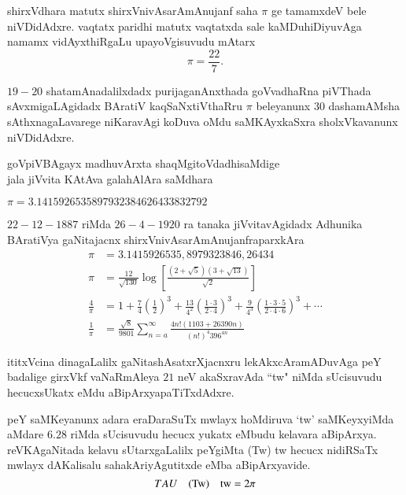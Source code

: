 shirxVdhara matutx shirxVnivAsarAmAnujanf saha $\pi$ ge tamamxdeV bele niVDidAdxre. vaqtatx paridhi matutx vaqtatxda sale kaMDuhiDiyuvAga namamx vidAyxthiRgaLu upayoVgisuvudu mAtarx
$$
\pi = \frac{22}{7}.
$$

$19-20$ shatamAnadalilxdadx purijaganAnxthada goVvadhaRna piVThada sAvxmigaLAgidadx BAratiV kaqSaNxtiVthaRru $\pi$ beleyanunx $30$ dashamAMsha sAthxnagaLavarege niKaravAgi koDuva oMdu saMKAyxkaSxra sholxVkavanunx niVDidAdxre. 
\begin{center}
goVpiVBAgayx madhuvArxta shaqMgitoVdadhisaMdige\\
jala jiVvita KAtAva galahAlAra saMdhara
\end{center}

$\pi = 3.1415926535897932384626433832792$

\vfill\eject
$22-12-1887$ riMda $26-4-1920$ ra tanaka jiVvitavAgidadx Adhunika BAratiVya gaNitajacnx shirxVnivAsarAmAnujanfraparxkAra
\begin{align*}
\pi &= 3.1415926535,8979323846,26434\\
\pi &= \frac{12}{\sqrt{130}}\log\left[\frac{{(2+\sqrt{5})}{(3+\sqrt{13})}}{\sqrt{2}}\right]\\
\frac{4}{\pi} &= 1 + \frac{7}{4}\left(\frac{1}{2}\right)^3 + \frac{13}{4^{2}}\left(\frac{1 \cdot 3}{2 \cdot 4}\right)^3 + \frac{9}{4^{3}}\left(\frac{1 \cdot 3 \cdot 5}{2 \cdot 4 \cdot 6}\right)^3 +\cdots\\
\frac{1}{\pi} &= \frac{\sqrt{8}}{9801} \sum_{n=a}^\infty \frac{4n!(1103+26390n)}{(n!)^{4}396^{4n}}
\end{align*}

ititxVcina dinagaLalilx gaNitashAsatxrXjacnxru lekAkxcAramADuvAga peY badalige girxVkf  vaNaRmAleya $21$ neV akaSxravAda ``tw" niMda sUcisuvudu hecucxsUkatx eMdu aBipArxyapaTiTxdAdxre.

peY saMKeyanunx adara eraDaraSuTx mwlayx hoMdiruva `tw' saMKeyxyiMda aMdare $6.28$ riMda sUcisuvudu hecucx yukatx eMbudu kelavara aBipArxya. reVKAgaNitada kelavu sUtarxgaLalilx peYgiMta (Tw) tw hecucx nidiRSaTx mwlayx dAKalisalu sahakAriyAgutitxde eMba aBipArxyavide.
$$
TAU\quad \text{(Tw)\quad tw} = 2\pi
$$
